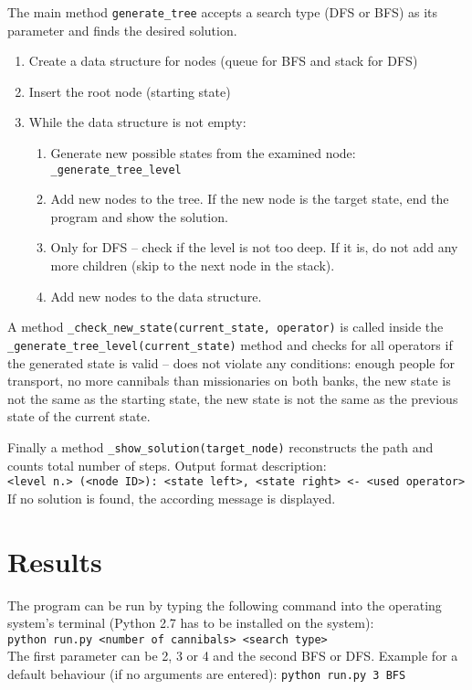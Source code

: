 \documentclass{article}
\begin{document}
 The main method \texttt{generate\_tree} accepts a search type (DFS or BFS) as its parameter and finds the desired solution. 
\begin{enumerate}
\item Create a data structure for nodes (queue for BFS and stack for DFS)
\item Insert the root node (starting state)
\item While the data structure is not empty:
	\begin{enumerate}
	\item Generate new possible states from the examined node: \verb|_generate_tree_level|
	\item Add new nodes to the tree. If the new node is the target state, end the program and show the solution. 
	\item Only for DFS -- check if the level is not too deep. If it is, do not add any more children (skip to the next node in the stack).
	\item Add new nodes to the data structure. 
	\end{enumerate}
\end{enumerate}

A method \verb|_check_new_state(current_state, operator)| is called inside the \verb|_generate_tree_level(current_state)| method and checks for all operators if the generated state is valid -- does not violate any conditions: enough people for transport, no more cannibals than missionaries on both banks, the new state is not the same as the starting state, the new state is not the same as the previous state of the current state.

Finally a method \verb|_show_solution(target_node)| reconstructs the path and counts total number of steps. Output format description: \\
\verb|<level n.> (<node ID>): <state left>, <state right> <- <used operator>|
If no solution is found, the according message is displayed.

\section{Results}
The program can be run by typing the following command into the operating system's terminal (Python 2.7 has to be installed on the system): \\ 
\verb|python run.py <number of cannibals> <search type>| 
\\ The first parameter can be 2, 3 or 4 and the second BFS or DFS. Example for a default behaviour (if no arguments are entered):
\verb|python run.py 3 BFS| 
\end{document}
